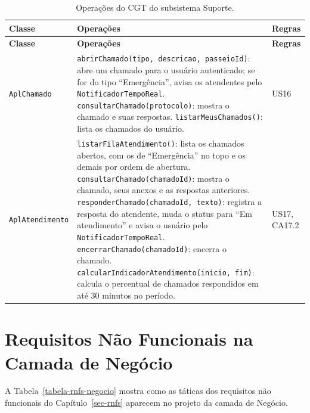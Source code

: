 \begin{footnotesize}
\begin{longtable}{|p{3.4cm}|p{7.6cm}|p{2.4cm}|}
	\caption{Operações do CGT do subsistema Suporte.}
	\label{tabela-cgt-suporte}\\\hline

	\rowcolor{lightgray}
	\textbf{Classe} & \textbf{Operações} & \textbf{Regras} \\\hline
	\endfirsthead
	\hline
	\rowcolor{lightgray}
	\textbf{Classe} & \textbf{Operações} & \textbf{Regras} \\\hline
	\endhead

	\texttt{AplChamado} & \texttt{abrirChamado(tipo, descricao, passeioId)}: abre um chamado para o usuário autenticado; se for do tipo ``Emergência'', avisa os atendentes pelo \texttt{NotificadorTempoReal}. \newline
	\texttt{consultarChamado(protocolo)}: mostra o chamado e suas respostas. \newline
	\texttt{listarMeusChamados()}: lista os chamados do usuário. & US16 \\\hline

	\texttt{AplAtendimento} & \texttt{listarFilaAtendimento()}: lista os chamados abertos, com os de ``Emergência'' no topo e os demais por ordem de abertura. \newline
	\texttt{consultarChamado(chamadoId)}: mostra o chamado, seus anexos e as respostas anteriores. \newline
	\texttt{responderChamado(chamadoId, texto)}: registra a resposta do atendente, muda o status para ``Em atendimento'' e avisa o usuário pelo \texttt{NotificadorTempoReal}. \newline
	\texttt{encerrarChamado(chamadoId)}: encerra o chamado. \newline
	\texttt{calcularIndicadorAtendimento(inicio, fim)}: calcula o percentual de chamados respondidos em até 30 minutos no período. & US17, CA17.2 \\\hline
\end{longtable}
\end{footnotesize}



\section{Requisitos Não Funcionais na Camada de Negócio}
\label{sec-logica-rnfs}

A Tabela~\ref{tabela-rnfs-negocio} mostra como as táticas dos requisitos não funcionais do Capítulo~\ref{sec-rnfs} aparecem no projeto da camada de Negócio.

